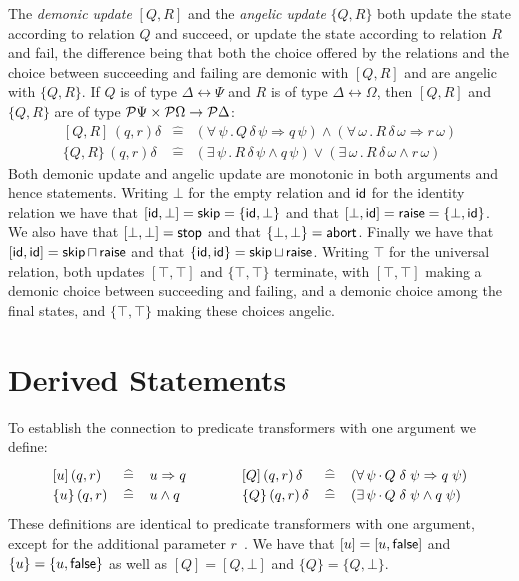 \documentclass[submission,copyright,creativecommons]{eptcs}
\newcommand{\KW}[1]{\mathop{\sf #1}}
\newcommand{\FALSE}{\KW{false}}
\newcommand{\ABORT}{\KW{abort}}
\newcommand{\SKIP}{\KW{skip}}
\newcommand{\RAISE}{\KW{raise}}
\newcommand{\STOP}{\KW{stop}}
\newcommand{\meet}{\sqcap}
\newcommand{\join}{\sqcup}
\newcommand{\con}{\wedge}
\newcommand{\dis}{\vee}
\newcommand{\imp}{\Rightarrow}
\newcommand{\rel}{\leftrightarrow}
\renewcommand{\dot}{\mathop{.}}
\newcommand{\defeq}{\left.\widehat{=}\right.}
\newcommand{\ID}{\KW{id}}
\begin{document}
The {\em demonic update} $[Q, R]$ and the {\em angelic update} $\{Q, R\}$ both update the state according to relation $Q$ and succeed, or update the state according to relation $R$ and fail, the difference being that both the choice offered by the relations and the choice between succeeding and failing are demonic with $[Q, R]$ and are angelic with $\{Q, R\}$. If $Q$ is of type $\Delta \rel \Psi$ and $R$ is of type $\Delta \rel \Omega$, then $[Q, R]$ and $\{Q, R\}$ are of type ${\cal P} \Psi \times {\cal P} \Omega \to {\cal P} \Delta$:
\[\renewcommand{\arraystretch}{1.2}\begin{array}{lcl}
   [Q, R]\,(q, r) \delta & \defeq & (\forall\, \psi \dot Q\,\delta\,\psi \imp q\,\psi) \con (\forall\, \omega \dot R\,\delta\,\omega \imp r\,\omega) \\
   \{Q, R\}\,(q, r) \delta & \defeq & (\exists\, \psi \dot R\,\delta\,\psi \con q\,\psi) \dis (\exists\, \omega \dot R\,\delta\,\omega \con r\,\omega)
\end{array}\]
Both demonic update and angelic update are monotonic in both arguments and hence statements. Writing $\bot$ for the empty relation and $\ID$ for the identity relation we have that $[\ID, \bot] = \SKIP = \{\ID, \bot\}$ and that $[\bot, \ID] = \RAISE = \{\bot, \ID\}$. We also have that $[\bot, \bot] = \STOP$ and that $\{\bot, \bot\} = \ABORT$. Finally we have that $[\ID, \ID] = \SKIP \meet \RAISE$ and that $\{\ID, \ID\} = \SKIP \join \RAISE$. Writing $\top$ for the universal relation, both updates $[\top, \top]$ and $\{\top, \top\}$ terminate, with $[\top, \top]$ making a demonic choice between succeeding and failing, and a demonic choice among the final states, and $\{\top, \top\}$ making these choices angelic.

\section{Derived Statements}
\label{sec:derived}

To establish the connection to predicate transformers with one argument we define:
\[\renewcommand{\arraystretch}{1.2}\begin{array}{lcl@{\qquad\qquad}lcl}
   [u]\,(q, r) & \defeq & u \imp q & 
     [Q]\,(q, r)\,\delta & \defeq & (\forall\, \psi \dot Q\;\delta\;\psi \imp q\;\psi) \\
   \{u\}\,(q, r) & \defeq & u \con q &
     \{Q\}\,(q, r)\,\delta & \defeq & (\exists\, \psi \dot Q\;\delta\;\psi \con q\;\psi)
\end{array}\]
These definitions are identical to predicate transformers with one argument, except for the additional parameter $r$~\cite{BackVonWright98RefinementCalculus}. We have that $[u] = [u, \FALSE]$ and $\{u\} = \{u, \FALSE\}$ as well as $[Q] = [Q, \bot]$ and $\{Q\} = \{Q, \bot\}$.
\end{document}
